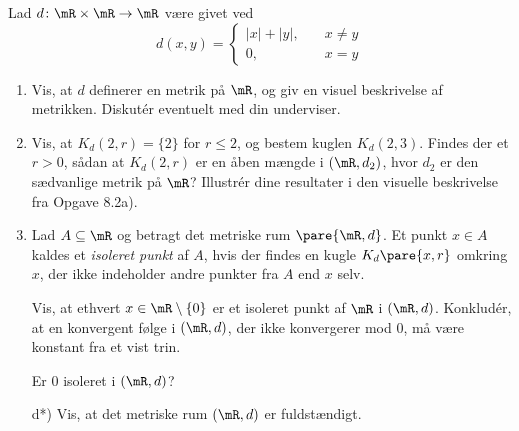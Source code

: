 \begin{opg}
Lad $d\colon \mR \times \mR \to \mR$ være givet ved
$$ d(x,y)=\begin{cases}|x|+|y|, &\quad  x\neq y\\0, &\quad  x=y \end{cases} $$
\begin{enumerate}
	\item Vis, at $d$ definerer en metrik på $\mR$, og giv en visuel beskrivelse af metrikken. Diskutér eventuelt med din underviser.
	
	\item Vis, at $K_d(2,r)=\{2\}$ for $r \leq 2$, og bestem kuglen $K_d(2,3)$. Findes der et $r >0$, sådan at $K_d(2,r)$ er en åben mængde i $(\mR, d_2)$, hvor $d_2$ er den sædvanlige metrik på $\mR$? Illustrér dine resultater i den visuelle beskrivelse fra Opgave 8.2a).
	
	\item Lad $A\subseteq\mR$ og betragt det metriske rum $\pare{\mR,d}$. Et punkt $x\in A$ kaldes et \textit{isoleret punkt} af $A$, hvis der findes en kugle $K_d\pare{x,r}$ omkring $x$, der ikke indeholder andre punkter fra $A$ end $x$ selv.
	
	Vis, at ethvert $x \in \mR \setminus \{0\}$ er et isoleret punkt af $\mR$ i $(\mR, d)$. Konkludér, at en konvergent følge i $(\mR, d)$, der ikke konvergerer mod $0$, må være konstant fra et vist trin. 
	
	Er $0$ isoleret i $(\mR, d)$?
	\item[d*)] Vis, at det metriske rum $(\mR, d)$ er fuldstændigt. 
\end{enumerate}
\end{opg}

